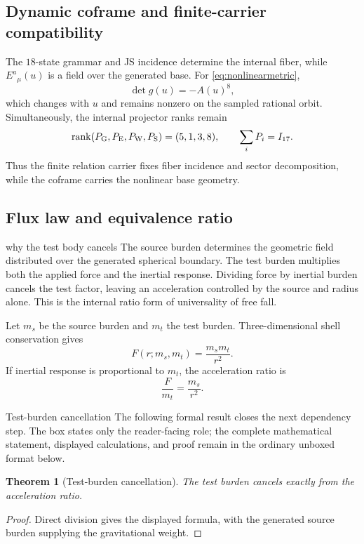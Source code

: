 \documentclass[11pt]{article}
\numberwithin{equation}{section}
\newtheorem{theorem}[definition]{Theorem}
\theoremstyle{remark}
\newcommand{\rank}{\operatorname{rank}}
\begin{document}
\subsection{Dynamic coframe and finite-carrier compatibility}
The $18$-state grammar and JS incidence determine the internal fiber, while $E^a{}_{\mu}(u)$ is a field over the generated base. For \eqref{eq:nonlinearmetric},
\begin{equation}
\det g(u)=-A(u)^8,
\end{equation}
which changes with $u$ and remains nonzero on the sampled rational orbit. Simultaneously, the internal projector ranks remain
\begin{equation}
\rank(P_{\rm G},P_{\rm E},P_{\rm W},P_{\rm S})=(5,1,3,8),
\qquad \sum_iP_i=I_{17}.
\end{equation}
Thus the finite relation carrier fixes fiber incidence and sector decomposition, while the coframe carries the nonlinear base geometry.

\subsection{Flux law and equivalence ratio}
\begin{interpretivebridge}{why the test body cancels}
The source burden determines the geometric field distributed over the generated spherical boundary. The test burden multiplies both the applied force and the inertial response. Dividing force by inertial burden cancels the test factor, leaving an acceleration controlled by the source and radius alone. This is the internal ratio form of universality of free fall.
\end{interpretivebridge}

Let $m_s$ be the source burden and $m_t$ the test burden. Three-dimensional shell conservation gives
\begin{equation}
F(r;m_s,m_t)=\frac{m_s m_t}{r^2}.
\end{equation}
If inertial response is proportional to $m_t$, the acceleration ratio is
\begin{equation}
\frac{F}{m_t}=\frac{m_s}{r^2}.
\end{equation}

\begin{proofguide}{Test-burden cancellation}
The following formal result closes the next dependency step. The box states only the reader-facing role; the complete mathematical statement, displayed calculations, and proof remain in the ordinary unboxed format below.
\end{proofguide}
\begin{theorem}[Test-burden cancellation]
The test burden cancels exactly from the acceleration ratio.
\end{theorem}
\begin{proof}
Direct division gives the displayed formula, with the generated source burden supplying the gravitational weight.
\end{proof}
\end{document}
